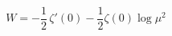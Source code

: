 \begin{equation}
W=-\frac{1}{2}\,\zeta'(0)-\frac{1}{2} \zeta(0) \log \mu^2
\label{effscal}
\end{equation}


